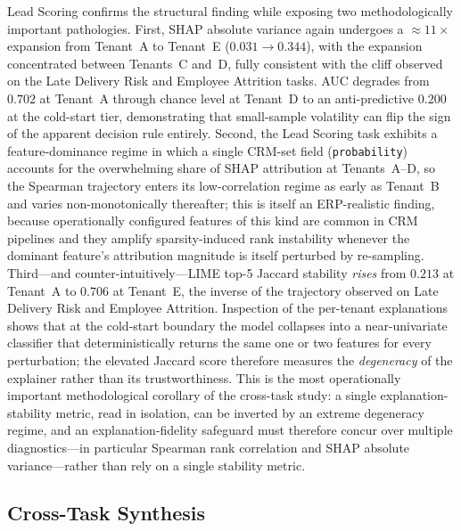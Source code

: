 Lead Scoring confirms the structural finding while exposing two
methodologically important pathologies. First, SHAP absolute variance
again undergoes a $\approx 11\times$ expansion from Tenant~A to
Tenant~E ($0.031 \to 0.344$), with the expansion concentrated between
Tenants~C and~D, fully consistent with the cliff observed on the Late
Delivery Risk and Employee Attrition tasks. AUC degrades from $0.702$ at
Tenant~A through chance level at Tenant~D to an anti-predictive
$0.200$ at the cold-start tier, demonstrating that small-sample
volatility can flip the sign of the apparent decision rule entirely.
Second, the Lead Scoring task exhibits a feature-dominance regime in
which a single CRM-set field (\texttt{probability}) accounts for the
overwhelming share of SHAP attribution at Tenants~A--D, so the
Spearman trajectory enters its low-correlation regime as early as
Tenant~B and varies non-monotonically thereafter; this is itself an
ERP-realistic finding, because operationally configured features
of this kind are common in CRM pipelines and they amplify
sparsity-induced rank instability whenever the dominant feature's
attribution magnitude is itself perturbed by re-sampling. Third---and
counter-intuitively---LIME top-5 Jaccard stability \emph{rises} from
$0.213$ at Tenant~A to $0.706$ at Tenant~E, the inverse of the
trajectory observed on Late Delivery Risk and Employee Attrition. Inspection
of the per-tenant explanations shows that at the cold-start boundary
the model collapses into a near-univariate classifier that
deterministically returns the same one or two features for every
perturbation; the elevated Jaccard score therefore measures the
\emph{degeneracy} of the explainer rather than its trustworthiness.
This is the most operationally important methodological corollary of
the cross-task study: a single explanation-stability metric, read in
isolation, can be inverted by an extreme degeneracy regime, and an
explanation-fidelity safeguard must therefore concur over multiple
diagnostics---in particular Spearman rank correlation and SHAP
absolute variance---rather than rely on a single stability metric.

\subsection{Cross-Task Synthesis}
\label{subsec:cross-task-synthesis}

